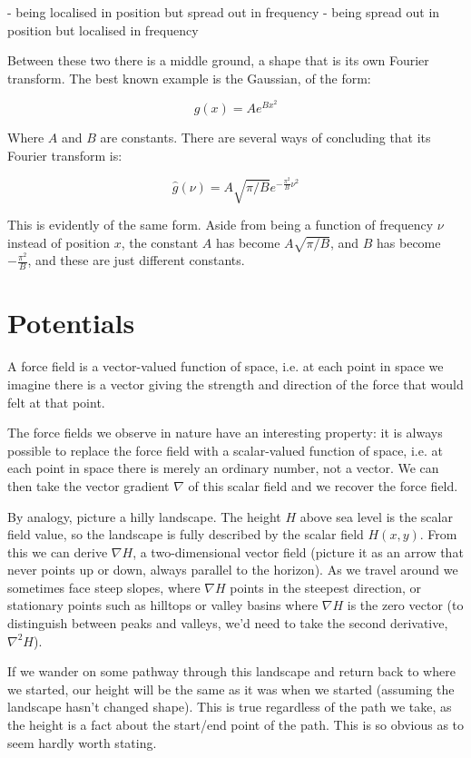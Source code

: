 - being localised in position but spread out in frequency
- being spread out in position but localised in frequency

Between these two there is a middle ground, a shape that is its own Fourier transform. The best known example is the Gaussian, of the form:

$$g(x) = Ae^{Bx^2}$$

Where $A$ and $B$ are constants. There are several ways of concluding that its Fourier transform is:

$$\hat{g}(\nu) = A \sqrt{\pi/B} e^{-\frac{\pi^2}{B} \nu^2}$$

This is evidently of the same form. Aside from being a function of frequency $\nu$ instead of position $x$, the constant $A$ has become $A \sqrt{\pi/B}$, and $B$ has become $-\frac{\pi^2}{B}$, and these are just different constants.

\section{Potentials} \label{sec:potential}

A force field is a vector-valued function of space, i.e. at each point in space we imagine there is a vector giving the strength and direction of the force that would felt at that point.

The force fields we observe in nature have an interesting property: it is always possible to replace the force field with a scalar-valued function of space, i.e. at each point in space there is merely an ordinary number, not a vector. We can then take the vector gradient $\nabla$ of this scalar field and we recover the force field.

By analogy, picture a hilly landscape. The height $H$ above sea level is the scalar field value, so the landscape is fully described by the scalar field $H(x, y)$. From this we can derive $\nabla H$, a two-dimensional vector field (picture it as an arrow that never points up or down, always parallel to the horizon). As we travel around we sometimes face steep slopes, where $\nabla H$ points in the steepest direction, or stationary points such as hilltops or valley basins where $\nabla H$ is the zero vector (to distinguish between peaks and valleys, we'd need to take the second derivative, $\nabla^2H$).

If we wander on some pathway through this landscape and return back to where we started, our height will be the same as it was when we started (assuming the landscape hasn't changed shape). This is true regardless of the path we take, as the height is a fact about the start/end point of the path. This is so obvious as to seem hardly worth stating.

